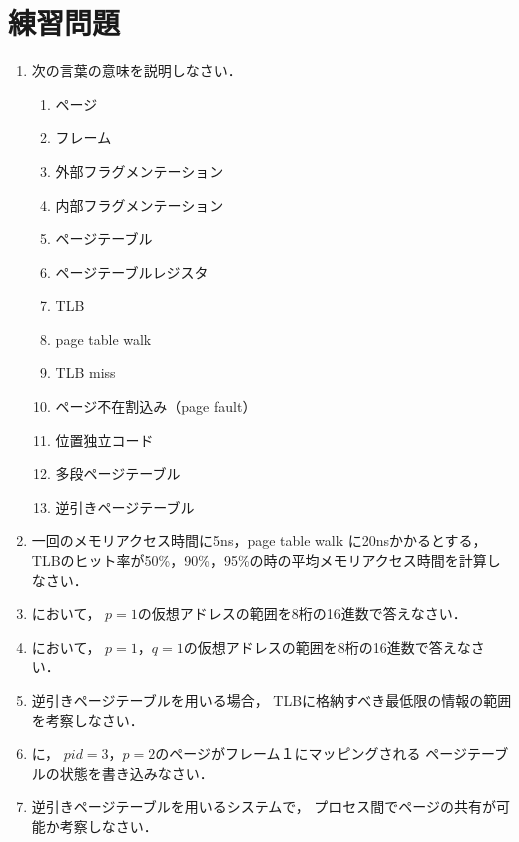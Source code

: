\section*{練習問題}
\begin{enumerate}
  \renewcommand{\labelenumi}{\ttfamily\arabic{chapter}.\arabic{enumi}}
  \setlength{\leftskip}{1em}
\item 次の言葉の意味を説明しなさい．
  \begin{enumerate}
  \item ページ
  \item フレーム
  \item 外部フラグメンテーション
  \item 内部フラグメンテーション
  \item ページテーブル
  \item ページテーブルレジスタ
  \item TLB
  \item page table walk
  \item TLB miss
  \item ページ不在割込み（page fault）
  \item 位置独立コード
  \item 多段ページテーブル
  \item 逆引きページテーブル
  \end{enumerate}
\item 一回のメモリアクセス時間に5ns，page table walk に20nsかかるとする，
  TLBのヒット率が50\%，90\%，95\%の時の平均メモリアクセス時間を計算しなさい．
\item {}において，
  $p=1$の仮想アドレスの範囲を8桁の16進数で答えなさい．
\item {}において，
  $p=1$，$q=1$の仮想アドレスの範囲を8桁の16進数で答えなさい．
\item 逆引きページテーブルを用いる場合，
  TLBに格納すべき最低限の情報の範囲を考察しなさい．
\item {}に，
  $pid=3$，$p=2$のページがフレーム１にマッピングされる
  ページテーブルの状態を書き込みなさい．
\item 逆引きページテーブルを用いるシステムで，
  プロセス間でページの共有が可能か考察しなさい．
\end{enumerate}
